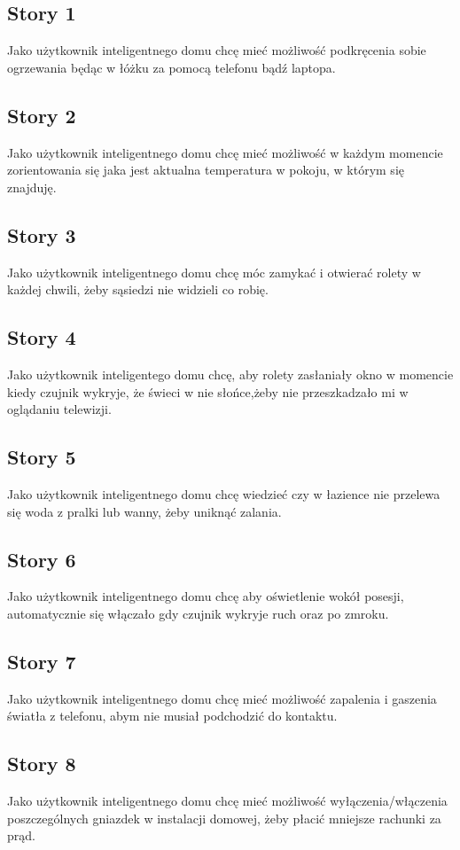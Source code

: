 	\subsection{Story 1}
	 Jako użytkownik inteligentnego domu chcę mieć możliwość podkręcenia sobie ogrzewania będąc w łóżku za pomocą telefonu bądź laptopa.
	
	\subsection{Story 2}
	Jako użytkownik inteligentnego domu chcę mieć możliwość w każdym momencie zorientowania się jaka jest aktualna temperatura w pokoju, w którym się znajduję.
	
	\subsection{Story 3}
	Jako użytkownik inteligentnego domu chcę móc zamykać i otwierać rolety w każdej chwili, żeby sąsiedzi nie widzieli co robię.
	
	\subsection{Story 4} 
	Jako użytkownik inteligentego domu chcę, aby rolety zasłaniały okno w momencie kiedy czujnik wykryje, że świeci w nie słońce,żeby nie przeszkadzało mi w oglądaniu telewizji.
	
	\subsection{Story 5}
	Jako użytkownik inteligentnego domu chcę wiedzieć czy w łazience nie przelewa się woda z pralki lub wanny, żeby uniknąć zalania. 
	
	\subsection{Story 6}
	Jako użytkownik inteligentnego domu chcę aby oświetlenie wokół posesji, automatycznie się włączało gdy czujnik wykryje ruch oraz po zmroku.
	
	\subsection{Story 7}
	Jako użytkownik inteligentnego domu chcę mieć możliwość zapalenia i gaszenia światła z telefonu, abym nie musiał podchodzić do kontaktu.
	
	\subsection{Story 8}
	Jako użytkownik inteligentnego domu chcę mieć możliwość wyłączenia/włączenia poszczególnych gniazdek w instalacji domowej, żeby płacić mniejsze rachunki za prąd.
	

